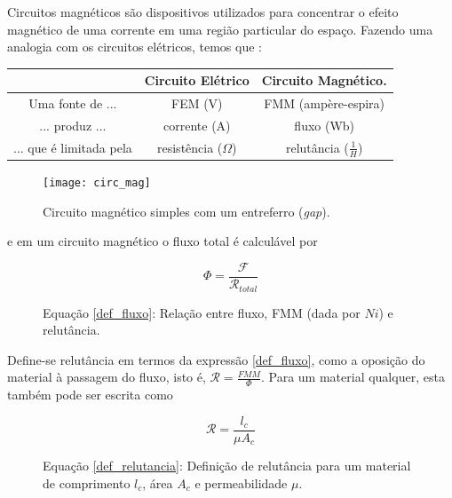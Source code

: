 \documentclass[]{report}
\begin{document}
Circuitos magnéticos são dispositivos utilizados para concentrar o efeito magnético de uma corrente em uma região particular do espaço. Fazendo uma analogia com os circuitos elétricos, temos que \cite{wentworth}: \newline

\begin{center}
\centering

\begin{tabular}{|c|c|c|}
\hline  & Circuito Elétrico & Circuito Magnético. \\ 
\hline Uma fonte de ... & FEM (V) & FMM  (ampère-espira) \\ 
\hline ... produz ... & corrente (A) & fluxo (Wb) \\ 
\hline ... que é limitada pela & resistência ($\Omega$) & relutância ($\frac{1}{H}$)\\ 
\hline 
\end{tabular} 
\end{center}

\begin{center}
\centering
\label{asdf}
\begin{figure}[htb]

\centering
\texttt{[image: circ\_mag]}
\caption{Circuito magnético simples com um entreferro (\textit{gap}). \cite{fitzgerald}}
\end{figure}
\end{center}

e em um circuito magnético o fluxo total é calculável por 

\begin{figure}[!ht]
\begin{equation}
\label{def_fluxo}
\Phi = \frac{\mathcal{F}}{\mathcal{R}_{total}}
\end{equation}
\caption*{Equação \ref{def_fluxo}: Relação entre fluxo, FMM (dada por $N i$) e relutância.}
\end{figure}

Define-se relutância em termos da expressão \ref{def_fluxo}, como a oposição do material à passagem do fluxo, isto é, $\mathcal{R} = \frac{FMM}{\Phi}$. Para um material qualquer, esta também pode ser escrita como

\begin{figure}[H]
\begin{equation}
\label{def_relutancia}
\mathcal{R} = \frac{l_c}{\mu A_c}
\end{equation}
\caption*{Equação \ref{def_relutancia}: Definição de relutância para um material de comprimento $l_c$, área $A_c$ e permeabilidade $\mu$.}
\end{figure}
\end{document}

